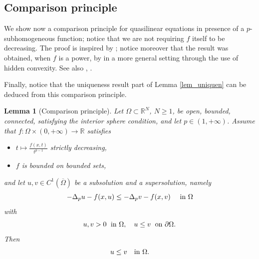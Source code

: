 \documentclass[11pt, reqno]{amsart}
\newtheorem{lemma}{Lemma}[section]
\theoremstyle{definition}
\numberwithin{equation}{section}
\newcommand{\R}{\mathbb{R}}
\begin{document}
\subsection{Comparison principle}
We show now a comparison principle for quasilinear equations in presence of a $p$-subhomogeneous function; notice that we are not requiring $f$ itself to be decreasing. 
The proof is inspired by \cite[Theorem 1.5]{MST24}; notice moreover that the result was obtained, when $f$ is a power, by \cite[Theorem 4.1]{BPZ22} in a more general setting through the use of hidden convexity.
See also \cite[Theorems 1.3 and 3.3]{DaSc04}, \cite[Lemma 2.1]{BMS23}. 

Finally, notice that the uniqueness result part of Lemma \ref{lem_uniquen} can be deduced from this comparison principle.

\begin{lemma}[Comparison principle]
\label{lem_comp_princip}
Let $\Omega \subset \R^N$, $N \geq 1$, be open, bounded, connected, satisfying the interior sphere condition, and let $p \in (1,+\infty)$. 
Assume that $f: \Omega \times (0,+\infty) \to \R$ satisfies
\begin{itemize}
\item $t \mapsto \frac{f(x, t)}{t^{p-1}}$ strictly decreasing, 
\item $f$ is bounded on bounded sets,
\end{itemize}
and let $u,v \in
 C^1(\overline{\Omega})$ be a subsolution and a supersolution,
namely
$$ -\Delta_p u - f(x,u) \leq -\Delta_p v - f(x,v) \quad \hbox{ in $\Omega$}$$
with 
$$u,v >0 \; \hbox{ in $\Omega$}, \quad u\leq v \; \hbox{ on $\partial \Omega$}.$$
Then
$$u \leq v \quad \hbox{in $\Omega$.}$$
\end{lemma}
\end{document}

